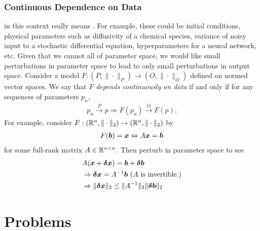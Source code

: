 \subsubsection{Continuous Dependence on Data}
 in this context really means . For example, these could be initial conditions, physical parameters such as diffusivity of a chemical species, variance of noisy input to a stochastic differential equation, hyperparameters for a neural network, etc. Given that we cannot  all of parameter space, we would like small perturbations in parameter space to lead to only small perturbations in output space. Consider a model $F:(P,\|\cdot\|_P) \to (O, \|\cdot\|_{O})$ defined on normed vector spaces. We say that $F$ \textit{ depends continuously on data } if and only if for any sequences of parameters $p_{n}$,
\begin{align} \label{1:cdd}
    p_n \overset{P}{\to} p \Rightarrow F(p_n) \overset{O}{\to} F(p).
\end{align}
For example, consider $F:(\mathbb{R}^{n}, \|\cdot\|_{2}) \to (\mathbb{R}^{n}, \|\cdot\|_{2})$ by 
\begin{align}\label{1:matinv}
    F(\boldsymbol{b}) = \boldsymbol{x} \Leftrightarrow A\boldsymbol{x} = \boldsymbol{b}
\end{align}
for some full-rank matrix $A \in \mathbb{R}^{n \times n}$. Then perturb in parameter space to see
\begin{align*}
    & A(\boldsymbol{x} + \boldsymbol{\delta x}) = \boldsymbol{b} + \boldsymbol{\delta b} \\
    &\Rightarrow \boldsymbol{\delta x} = A^{-1} \boldsymbol{b} \textup{    } (A \textup{ is invertible.}) \\
    &\Rightarrow \|\boldsymbol{\delta x}\|_{2} \leq \|A^{-1}\|_{2} \|\boldsymbol{\delta b}\|_{2}
\end{align*}
\section*{Problems}
%
\iffalse
\begin{prob}
\label{prob1}
A given problem or Excercise is described here. The
problem is described here. The problem is described here.
\end{prob}

\begin{prob}
\label{prob2}
\textbf{Problem Heading}\\
(a) The first part of the problem is described here.\\
(b) The second part of the problem is described here.
\end{prob}
\fi

%
